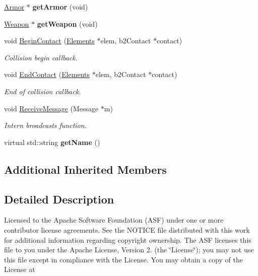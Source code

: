 \begin{DoxyCompactItemize}
\item 
\hypertarget{class_equipment_aa257497229b90a64bda53df40b38871c}{\hyperlink{class_armor}{Armor} $\ast$ {\bfseries get\+Armor} (void)}\label{class_equipment_aa257497229b90a64bda53df40b38871c}

\item 
\hypertarget{class_equipment_a54fd1c2d6cca6b4d2584eb0cf8725bd2}{\hyperlink{class_weapon}{Weapon} $\ast$ {\bfseries get\+Weapon} (void)}\label{class_equipment_a54fd1c2d6cca6b4d2584eb0cf8725bd2}

\item 
void \hyperlink{class_equipment_a0c706b45578e8d01fec7b8ee1b773987}{Begin\+Contact} (\hyperlink{class_elements}{Elements} $\ast$elem, b2\+Contact $\ast$contact)
\begin{DoxyCompactList}\small\item\em Collision begin callback. \end{DoxyCompactList}\item 
void \hyperlink{class_equipment_abda1acd976a1c33f3aa398b3a9a64555}{End\+Contact} (\hyperlink{class_elements}{Elements} $\ast$elem, b2\+Contact $\ast$contact)
\begin{DoxyCompactList}\small\item\em End of collision callback. \end{DoxyCompactList}\item 
void \hyperlink{class_equipment_ab195be955597ce6f64c117d675df3af4}{Receive\+Message} (Message $\ast$m)
\begin{DoxyCompactList}\small\item\em Intern broadcasts function. \end{DoxyCompactList}\item 
\hypertarget{class_equipment_a36ba8d5a456a49363e695e83311a396f}{virtual std\+::string {\bfseries get\+Name} ()}\label{class_equipment_a36ba8d5a456a49363e695e83311a396f}

\end{DoxyCompactItemize}
\subsection*{Additional Inherited Members}


\subsection{Detailed Description}
Licensed to the Apache Software Foundation (A\+S\+F) under one or more contributor license agreements. See the N\+O\+T\+I\+C\+E file distributed with this work for additional information regarding copyright ownership. The A\+S\+F licenses this file to you under the Apache License, Version 2. (the \char`\"{}\+License\char`\"{}); you may not use this file except in compliance with the License. You may obtain a copy of the License at

